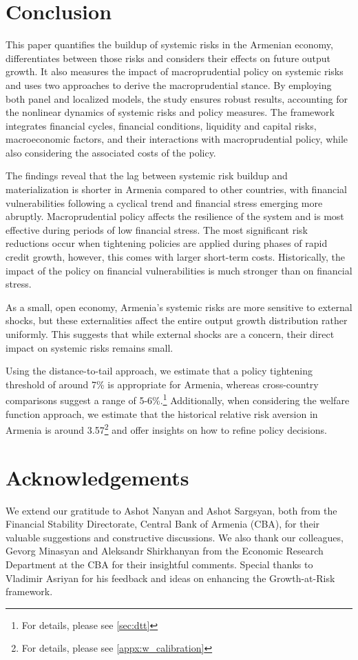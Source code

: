 \documentclass[12pt,a4paper]{article}
\begin{document}
\section{Conclusion}
This paper quantifies the buildup of systemic risks in the Armenian economy, differentiates between those risks and considers their effects on future output growth. It also measures the impact of macroprudential policy on systemic risks and uses two approaches to derive the macroprudential stance. By employing both panel and localized models, the study ensures robust results, accounting for the nonlinear dynamics of systemic risks and policy measures. The framework integrates financial cycles, financial conditions, liquidity and capital risks, macroeconomic factors, and their interactions with macroprudential policy, while also considering the associated costs of the policy.

The findings reveal that the lag between systemic risk buildup and materialization is shorter in Armenia compared to other countries, with financial vulnerabilities following a cyclical trend and financial stress emerging more abruptly. Macroprudential policy affects the resilience of the system and is most effective during periods of low financial stress. The most significant risk reductions occur when tightening policies are applied during phases of rapid credit growth, however, this comes with larger short-term costs. Historically, the impact of the policy on financial vulnerabilities is much stronger than on financial stress.

As a small, open economy, Armenia's systemic risks are more sensitive to external shocks, but these externalities affect the entire output growth distribution rather uniformly. This suggests that while external shocks are a concern, their direct impact on systemic risks remains small.

Using the distance-to-tail approach, we estimate that a policy tightening threshold of around 7\% is appropriate for Armenia, whereas cross-country comparisons suggest a range of 5-6\%.\footnote{For details, please see \autoref{sec:dtt}} Additionally, when considering the welfare function approach, we estimate that the historical relative risk aversion in Armenia is around 3.57\footnote{For details, please see \ref{appx:w_calibration}} and offer insights on how to refine policy decisions.


\section*{Acknowledgements}
We extend our gratitude to Ashot Nanyan and Ashot Sargsyan, both from the Financial Stability Directorate, Central Bank of Armenia (CBA), for their valuable suggestions and constructive discussions. We also thank our colleagues, Gevorg Minasyan and Aleksandr Shirkhanyan from the Economic Research Department at the CBA for their insightful comments. Special thanks to Vladimir Asriyan for his feedback and ideas on enhancing the Growth-at-Risk framework.
\end{document}

